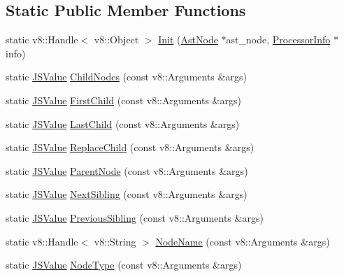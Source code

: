 \subsection*{Static Public Member Functions}
\begin{DoxyCompactItemize}
\item 
static v8::Handle$<$ v8::Object $>$ \hyperlink{classmocha_1_1_ast_for_v8_a1ac9550feb638f8104a62b8159b5d492}{Init} (\hyperlink{classmocha_1_1_ast_node}{AstNode} $\ast$ast\_\-node, \hyperlink{classmocha_1_1_processor_info}{ProcessorInfo} $\ast$info)
\item 
static \hyperlink{classmocha_1_1_ast_for_v8_af0e3f6f88e017315384842e6e8c20c9d}{JSValue} \hyperlink{classmocha_1_1_ast_for_v8_ac25f160a30e19de142b330f8221e2c8f}{ChildNodes} (const v8::Arguments \&args)
\item 
static \hyperlink{classmocha_1_1_ast_for_v8_af0e3f6f88e017315384842e6e8c20c9d}{JSValue} \hyperlink{classmocha_1_1_ast_for_v8_a9102f7cecb5807fd224c8f468b8c6a54}{FirstChild} (const v8::Arguments \&args)
\item 
static \hyperlink{classmocha_1_1_ast_for_v8_af0e3f6f88e017315384842e6e8c20c9d}{JSValue} \hyperlink{classmocha_1_1_ast_for_v8_ad46572498216e2e7690d6c35ae2b7f67}{LastChild} (const v8::Arguments \&args)
\item 
static \hyperlink{classmocha_1_1_ast_for_v8_af0e3f6f88e017315384842e6e8c20c9d}{JSValue} \hyperlink{classmocha_1_1_ast_for_v8_a691a43f2cf83282fdc4d95f72601b4d7}{ReplaceChild} (const v8::Arguments \&args)
\item 
static \hyperlink{classmocha_1_1_ast_for_v8_af0e3f6f88e017315384842e6e8c20c9d}{JSValue} \hyperlink{classmocha_1_1_ast_for_v8_a216dd7720b74a1ad8e20b611bffb71fe}{ParentNode} (const v8::Arguments \&args)
\item 
static \hyperlink{classmocha_1_1_ast_for_v8_af0e3f6f88e017315384842e6e8c20c9d}{JSValue} \hyperlink{classmocha_1_1_ast_for_v8_a6bc80a1b960c5d294ae4c8e684b4dc69}{NextSibling} (const v8::Arguments \&args)
\item 
static \hyperlink{classmocha_1_1_ast_for_v8_af0e3f6f88e017315384842e6e8c20c9d}{JSValue} \hyperlink{classmocha_1_1_ast_for_v8_a444a668bbd97fc3e9b59b92ecdd924e8}{PreviousSibling} (const v8::Arguments \&args)
\item 
static v8::Handle$<$ v8::String $>$ \hyperlink{classmocha_1_1_ast_for_v8_ad552bda0c52da0b04ce36a0ca3e9998e}{NodeName} (const v8::Arguments \&args)
\item 
static \hyperlink{classmocha_1_1_ast_for_v8_af0e3f6f88e017315384842e6e8c20c9d}{JSValue} \hyperlink{classmocha_1_1_ast_for_v8_aaf883ca87d25189a7517527b57bda8f1}{NodeType} (const v8::Arguments \&args)
\end{DoxyCompactItemize}
